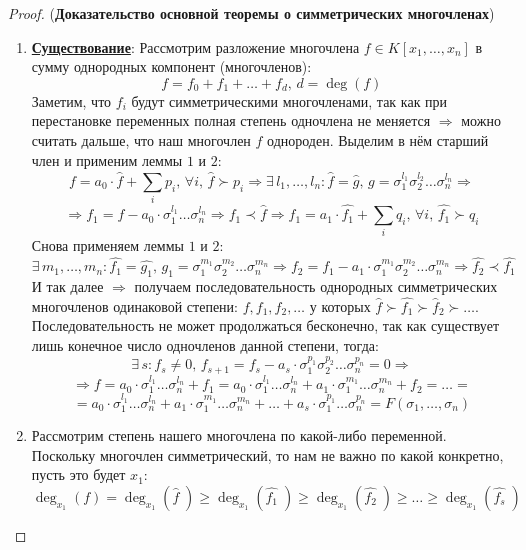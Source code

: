 \documentclass[12pt]{article}
\theoremstyle{definition}
\newcommand{\ddsum}[2]{\displaystyle\sum\limits_{#1}^{#2}}
\newcommand{\wht}[1]{\widehat{#1}}
\begin{document}
\begin{proof}(\textbf{Доказательство основной теоремы о симметрических многочленах})
	\begin{enumerate}[label=\arabic*)]
		\item \textbf{\uline{Существование}}: Рассмотрим разложение многочлена $f \in K[x_1,\dotsc, x_n]$ в сумму однородных компонент (многочленов):
		$$
			f = f_0 + f_1 + \dotsc + f_d, \, d = \deg(f)
		$$
		Заметим, что $f_i$ будут симметрическими многочленами, так как при перестановке переменных полная степень одночлена не меняется $\Rightarrow$ можно считать дальше, что наш многочлен $f$ однороден. Выделим в нём старший член и применим леммы $1$ и $2$:
		$$
			f = a_0{\cdot}\wht{f} + \ddsum{i}{}p_i, \, \forall i, \, \wht{f}\succ p_i \Rightarrow \exists \, l_1,\dotsc, l_n \colon \wht{f} = \wht{g}, \, g = \sigma_1^{l_1}\sigma_2^{l_2}\dotsc \sigma_n^{l_n} \Rightarrow
		$$
		$$
			\Rightarrow f_1 = f - a_0{\cdot}\sigma_1^{l_1}\dotsc \sigma_n^{l_n} \Rightarrow \wht{f_1} \prec \wht{f} \Rightarrow f_1 = a_1{\cdot}\wht{f_1} + \ddsum{i}{}q_i, \, \forall i, \, \wht{f_1}\succ q_i
		$$
		Снова применяем леммы $1$ и $2$:
		$$
			\exists\, m_1,\dotsc, m_n \colon \wht{f_1} = \wht{g_1}, \, g_1 = \sigma_1^{m_1}\sigma_2^{m_2}\dotsc\sigma_n^{m_n} \Rightarrow f_2 = f_1 - a_1{\cdot}\sigma_1^{m_1}\sigma_2^{m_2}\dotsc\sigma_n^{m_n} \Rightarrow \wht{f_2} \prec \wht{f_1}
		$$
		И так далее $\Rightarrow$ получаем последовательность однородных симметрических многочленов одинаковой степени: $f, f_1, f_2,\dotsc$ у которых $\wht{f} \succ \wht{f_1} \succ \wht{f}_2 \succ \dotsc$. Последовательность не может продолжаться бесконечно, так как существует лишь конечное число одночленов данной степени, тогда: 
		$$
			\exists \, s \colon f_s \neq 0, \, f_{s + 1} = f_s - a_s{\cdot}\sigma_1^{p_1}\sigma_2^{p_2}\dotsc\sigma_n^{p_n} = 0 \Rightarrow
		$$
		$$
			\Rightarrow f = a_0{\cdot}\sigma_1^{l_1}\dotsc\sigma_n^{l_n} + f_1 = a_0{\cdot}\sigma_1^{l_1}\dotsc\sigma_n^{l_n} + a_1{\cdot}\sigma_1^{m_1}\dotsc\sigma_n^{m_n} + f_2 = \dotsc = 
		$$
		$$
			= a_0{\cdot}\sigma_1^{l_1}\dotsc\sigma_n^{l_n} + a_1{\cdot}\sigma_1^{m_1}\dotsc\sigma_n^{m_n} + \dotsc + a_s{\cdot}\sigma_1^{p_1}\dotsc\sigma_n^{p_n} = F(\sigma_1,\dotsc,\sigma_n)
		$$
		\item Рассмотрим степень нашего многочлена по какой-либо переменной. Поскольку многочлен симметрический, то нам не важно по какой конкретно, пусть это будет $x_1$:
		$$
			\deg_{x_1}(f) = \deg_{x_1}(\wht{f}\;) \geq \deg_{x_1}(\wht{f_1}\;)\geq \deg_{x_1}(\wht{f_2}\;) \geq \dotsc \geq  \deg_{x_1}(\wht{f_s}\;) 
$$
\end{enumerate}
\end{proof}
\end{document}
